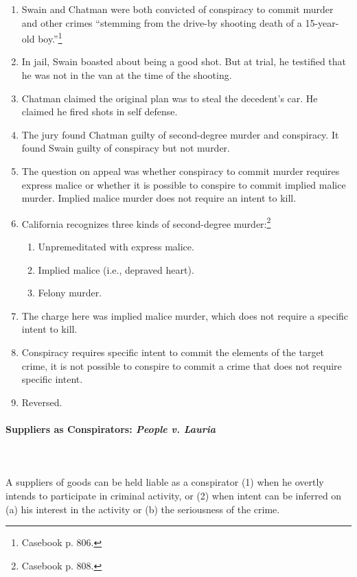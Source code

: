 \begin{enumerate}
    \item Swain and Chatman were both convicted of conspiracy to commit murder 
    and other crimes ``stemming from the drive-by shooting death of a 
    15-year-old boy.''\footnote{Casebook p. 806.}
    \item In jail, Swain boasted about being a good shot. But at trial, he 
    testified that he was not in the van at the time of the shooting.
    \item Chatman claimed the original plan was to steal the decedent's car.  
    He claimed he fired shots in self defense.
    \item The jury found Chatman guilty of second-degree murder and 
    conspiracy. It found Swain guilty of conspiracy but not murder.
    \item The question on appeal was whether conspiracy to commit murder 
    requires express malice or whether it is possible to conspire to commit 
    implied malice murder. Implied malice murder does not require an intent to 
    kill.
    \item California recognizes three kinds of second-degree 
    murder:\footnote{Casebook p. 808.}
    \begin{enumerate}
        \item Unpremeditated with express malice.
        \item Implied malice (i.e., depraved heart).
        \item Felony murder.
    \end{enumerate}
    \item The charge here was implied malice murder, which does not require a 
    specific intent to kill.
    \item Conspiracy requires specific intent to commit the elements of the 
    target crime, it is not possible to conspire to commit a crime that does 
    not require specific intent.
    \item Reversed.
\end{enumerate}

\paragraph{Suppliers as Conspirators: \emph{People v. Lauria}}
~\\\\
A suppliers of goods can be held liable as a conspirator (1) when he overtly 
intends to participate in criminal activity, or (2) when intent can be 
inferred on (a) his interest in the activity or (b) the seriousness of the 
crime.

